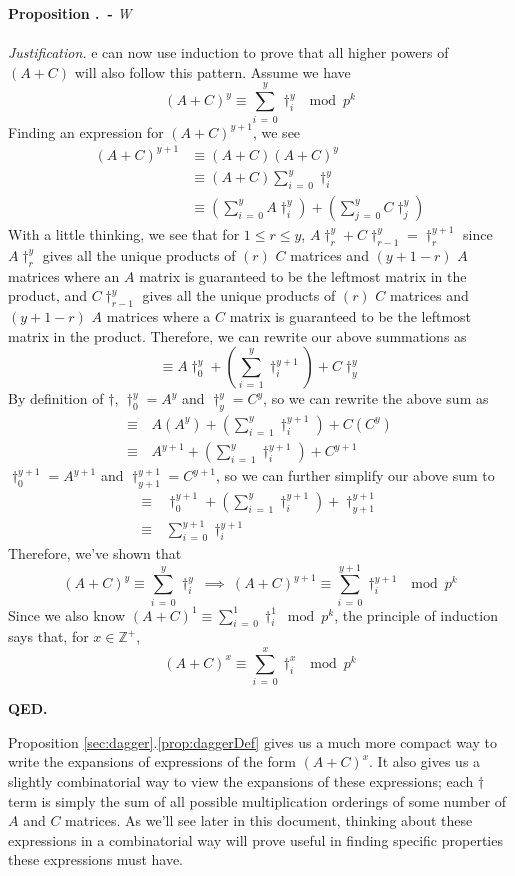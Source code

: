 \documentclass[a4paper, 12pt, reqno]{amsart}
\newcounter{propcounter}[section]
\newenvironment{proposition}[1]
{
	\refstepcounter{propcounter}
	\textbf{Proposition \thesection.\thepropcounter \ - }\emph{#1} \\ \\
	\emph{Justification.}
}
{
	\textbf{QED.} \\
}
\begin{document}
\begin{proposition}
			We can now use induction to prove that all higher powers of $(A + C)$ will also follow this pattern. Assume we have
			\[
				(A + C)^y \equiv \sum_{i\,=\,0}^y \dag_i^y \mod{p^k}
			\]
			Finding an expression for $(A + C)^{y+1}$, we see
			\begin{align*}
				(A + C)^{y+1} & \equiv (A + C)(A + C)^y                 \\
				              & \equiv (A + C)\sum_{i\,=\,0}^y \dag_i^y \\
							  & \equiv \left( \sum_{i\,=\,0}^y A\dag_i^y \right) + \left( \sum_{j\,=\,0}^y C\dag_j^y \right)
			\end{align*}
			With a little thinking, we see that for $1 \leq r \leq y$, $A\dag_r^y + C\dag_{r-1}^y = \dag_r^{y+1}$ since $A\dag_r^y$ gives all the unique products of $(r)$ 
			$C$ matrices and $(y+1-r)$ $A$ matrices where an $A$ matrix is guaranteed to be the leftmost matrix in the product, and $C\dag_{r-1}^y$ gives all the unique 
			products of $(r)$ $C$ matrices and $(y+1-r)$ $A$ matrices where a $C$ matrix is guaranteed to be the leftmost matrix in the product. Therefore, we can rewrite 
			our above summations as
			\[
				\equiv A\dag_0^y + \left( \sum_{i\,=\,1}^y \dag_i^{y+1} \right) + C\dag_y^y
			\]
			By definition of $\dag$, $\dag_0^y = A^y$ and $\dag_y^y = C^y$, so we can rewrite the above sum as
			\begin{align*}
				\equiv & \, A(A^y) + \left( \sum_{i\,=\,1}^y \dag_i^{y+1} \right) + C(C^y)   \\
				\equiv & \, A^{y+1} + \left( \sum_{i\,=\,1}^y \dag_i^{y+1} \right) + C^{y+1}
			\end{align*}
			$\dag_0^{y+1} = A^{y+1}$ and $\dag_{y+1}^{y+1} = C^{y+1}$, so we can further simplify our above sum to
			\begin{align*}
				\equiv & \, \dag_0^{y+1} + \left( \sum_{i\,=\,1}^y \dag_i^{y+1} \right) + \dag_{y+1}^{y+1} \\
				\equiv & \, \sum_{i\,=\,0}^{y+1} \dag_i^{y+1}
			\end{align*}
			Therefore, we've shown that
			\[
				(A + C)^y \equiv \sum_{i\,=\,0}^y \dag_i^y \ \implies\  (A + C)^{y+1} \equiv \sum_{i\,=\,0}^{y+1} \dag_i^{y+1} \mod{p^k}
			\]
			Since we also know $(A + C)^1 \equiv \sum_{i\,=\,0}^1 \dag_i^1 \bmod{p^k}$, the principle of induction says that, for $x \in \mathds{Z}^+$,
			\[
				(A + C)^x \equiv \sum_{i\,=\,0}^x \dag_i^x \mod{p^k}
			\]
		\end{proposition}
		
		Proposition \ref{sec:dagger}.\ref{prop:daggerDef} gives us a much more compact way to write the expansions of expressions of the form $(A + C)^x$. It also gives us a
		slightly combinatorial way to view the expansions of these expressions; each $\dag$ term is simply the sum of all possible multiplication orderings of some number of
		$A$ and $C$ matrices. As we'll see later in this document, thinking about these expressions in a combinatorial way will prove useful in finding 
		specific properties these expressions must have.
		
\end{document}

